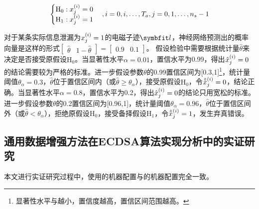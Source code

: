 {	\begin{equation}
		\begin{cases}
			\mathrm H_0:x^{(i)}_j=0\\
			\mathrm H_{1}:x^{(i)}_j=1
		\end{cases},i=0,i,\dots,T_a,j=0,1,\dots,n_s-1
		\label{eq:determindewhich}
	\end{equation}
	
	
	\begin{example}
		对于某条实际信息泄漏为$x^{(i)}_j=1$的电磁子迹$\Vector l$，神经网络预测出的概率向量是这样的形式$\begin{bmatrix}\hat\theta&1-\hat\theta\end{bmatrix}=\begin{bmatrix}0.9&0.1\end{bmatrix}$。%
		假设检验中需要根据统计量$\hat\theta$来决定是否接受原假设$\mathrm H_0$。当显著性水平$\alpha=0.01$，置信水平为0.99，得出$\hat{x}^{(i)}_j=0$的结论需要较为严格的标准。进一步假设参数$\theta$的0.99置信区间为[0.3,1]\footnote{显著性水平与越小，置信度越高，置信区间范围越高。}，统计量阈值$\theta_{\alpha}=0.3$，$\hat\theta$位于置信区间内（或$\hat\theta\ge\theta_{\alpha}$），接受原假设$\mathrm H_0$，令$\hat {\tilde{x}}^{(i)}_j=0$，结论正确。当显著性水平$\alpha=0.8$，置信水平为0.2，得出$\hat{x}^{(i)}_j=0$的结论只用宽松的标准。进一步假设参数$\theta$的0.2置信区间为[0.96,1]，统计量阈值$\theta_{\alpha}=0.96$，$\hat\theta$位于置信区间外（或$\hat\theta<\theta_{\alpha}$），拒绝原假设$\mathrm H_0$，接受备择假设$\mathrm H_1$，令$\hat {\tilde{x}}^{(i)}_j=1$，发生弃真错误。
	\end{example}
	
	\subsection{通用数据增强方法在ECDSA算法实现分析中的实证研究}

	本文进行实证研究过程中，使用的机器配置与的机器配置完全一致。

}
